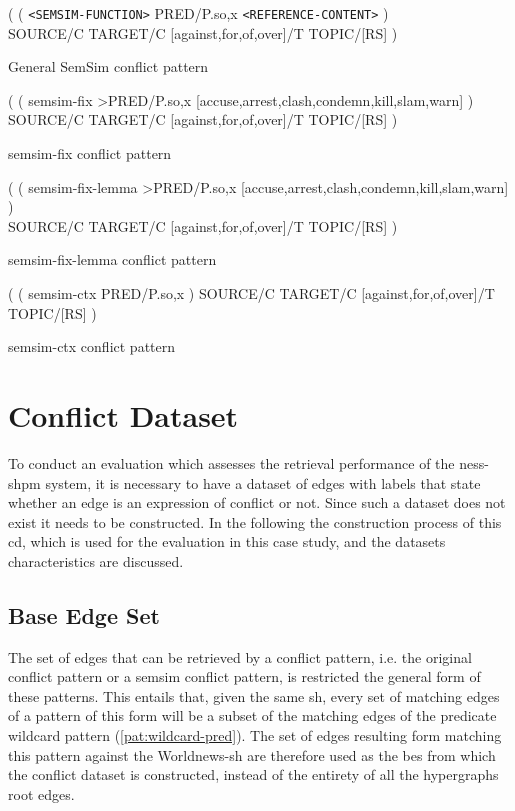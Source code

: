 \documentclass[11pt, numbers=noenddot]{scrreprt}
\begin{document}
\begin{pattern}[H]
  \normalfont\sffamily
  \centering
  ( ( \texttt{<SEMSIM-FUNCTION>} PRED/P.{so,x} \texttt{<REFERENCE-CONTENT>} ) \\ SOURCE/C TARGET/C [against,for,of,over]/T TOPIC/[RS] )
  \caption{General SemSim conflict pattern}
  \label{pat:semsim-conflict}
\end{pattern}

\begin{pattern}[H]
  \normalfont\sffamily
  \centering
    ( ( semsim-fix >PRED/P.{so,x} [accuse,arrest,clash,condemn,kill,slam,warn] ) \\ SOURCE/C TARGET/C [against,for,of,over]/T TOPIC/[RS] )
  \caption{semsim-fix conflict pattern}
  \label{pat:semsim-fix-conflict}
\end{pattern}

\begin{pattern}[H]
  \normalfont\sffamily
  \centering
   ( ( semsim-fix-lemma >PRED/P.{so,x} [accuse,arrest,clash,condemn,kill,slam,warn] ) \\ SOURCE/C TARGET/C [against,for,of,over]/T TOPIC/[RS] )
  \caption{semsim-fix-lemma conflict pattern}
  \label{pat:semsim-fix-lemma-conflict}
\end{pattern}

\begin{pattern}[H]
  \normalfont\sffamily
  \centering
   ( ( semsim-ctx PRED/P.{so,x} ) SOURCE/C TARGET/C [against,for,of,over]/T TOPIC/[RS] )
  \caption{semsim-ctx conflict pattern}
  \label{pat:semsim-ctx-conflict}
\end{pattern}



\section{Conflict Dataset}
\label{sec:conflict-dataset}
To conduct an evaluation which assesses the retrieval performance of the \gls{ness-shpm} system, it is necessary to have a dataset of edges with labels that state whether an edge is an expression of conflict or not. Since such a dataset does not exist it needs to be constructed. In the following the construction process of this \gls{cd}, which is used for the evaluation in this case study, and the datasets characteristics are discussed.

\subsection{Base Edge Set}
\label{sec:base-edge-set}
The set of edges that can be retrieved by a conflict pattern, i.e. the original conflict pattern or a semsim conflict pattern, is restricted the general form of these patterns. This entails that, given the same \gls{sh}, every set of matching edges of a pattern of this form will be a subset of the matching edges of the predicate wildcard pattern (\cref{pat:wildcard-pred}). The set of edges resulting form matching this pattern against the Worldnews-\gls{sh} are therefore used as the \gls{bes} from which the conflict dataset is constructed, instead of the entirety of all the hypergraphs root edges.
\end{document}
